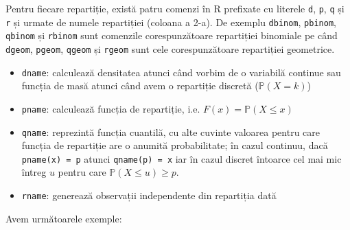 \documentclass[]{article}
\begin{document}
Pentru fiecare repartiție, există patru comenzi în R prefixate cu
literele \texttt{d}, \texttt{p}, \texttt{q} și \texttt{r} și urmate de
numele repartiției (coloana a 2-a). De exemplu \texttt{dbinom},
\texttt{pbinom}, \texttt{qbinom} și \texttt{rbinom} sunt comenzile
corespunzătoare repartiției binomiale pe când \texttt{dgeom},
\texttt{pgeom}, \texttt{qgeom} și \texttt{rgeom} sunt cele
corespunzătoare repartiției geometrice.

\begin{itemize}
\item
  \texttt{dname}: calculează densitatea atunci când vorbim de o
  variabilă continue sau funcția de masă atunci când avem o repartiție
  discretă (\(\mathbb{P}(X=k)\))
\item
  \texttt{pname}: calculează funcția de repartiție, i.e.
  \(F(x)=\mathbb{P}(X\leq x)\)
\item
  \texttt{qname}: reprezintă funcția cuantilă, cu alte cuvinte valoarea
  pentru care funcția de repartiție are o anumită probabilitate; în
  cazul continuu, dacă \texttt{pname(x)\ =\ p} atunci
  \texttt{qname(p)\ =\ x} iar în cazul discret întoarce cel mai mic
  întreg \(u\) pentru care \(\mathbb{P}(X\leq u)\geq p\).
\item
  \texttt{rname}: generează observații independente din repartiția dată
\end{itemize}

Avem următoarele exemple:
\end{document}

